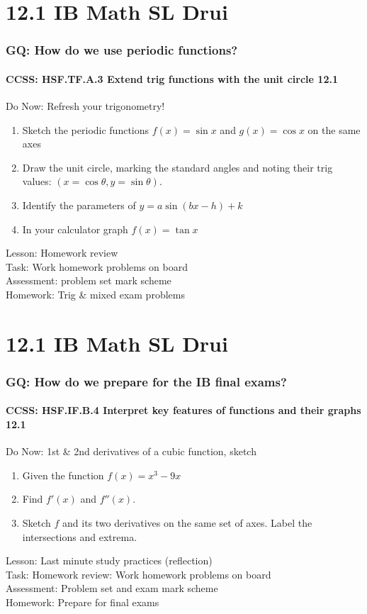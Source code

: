 \documentclass{beamer}
\begin{document}
  \section{12.1 IB Math SL Drui}
  \frame
  {
    \frametitle{GQ: How do we use periodic functions?}
    \framesubtitle{CCSS: HSF.TF.A.3 Extend trig functions with the unit circle \qquad \alert{12.1}}

    \begin{block}{Do Now: Refresh your trigonometry!}
      \begin{enumerate}
      \item Sketch the periodic functions $f(x)=\sin{x}$ and $g(x)=\cos{x}$ on the same axes
      \item Draw the unit circle, marking the standard angles and noting their trig values: $(x=\cos{\theta}, y=\sin{\theta})$.
      \item Identify the parameters of $y=a\sin{(bx-h)}+k$
      \item In your calculator graph $f(x)=\tan{x}$
      \end{enumerate}
   \end{block}
    Lesson: Homework review\\[5pt]
    Task: Work homework problems on board\\%
    Assessment: problem set mark scheme\\%
    Homework: Trig \& mixed exam problems
  }

  \section{12.1 IB Math SL Drui}
  \frame
  {
    \frametitle{GQ: How do we prepare for the IB final exams?}
    \framesubtitle{CCSS: HSF.IF.B.4 Interpret key features of functions and their graphs \qquad \alert{12.1}}

    \begin{block}{Do Now: 1st \& 2nd derivatives of a cubic function, sketch}
      \begin{enumerate}
      \item Given the function $f(x)=x^3-9x$
      \item Find $f'(x)$ and $f''(x)$.
      \item Sketch $f$ and its two derivatives on the same set of axes. Label the intersections and extrema.
      \end{enumerate}
   \end{block}
    Lesson: Last minute study practices (reflection) \\[5pt]
    Task: Homework review: Work homework problems on board\\%
    Assessment: Problem set and exam mark scheme\\%
    Homework: Prepare for final exams
  }
\end{document}
